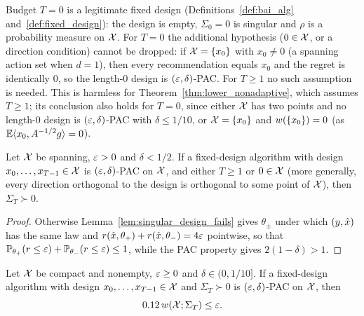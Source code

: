 \begin{remark}[The case $T = 0$]\label{rem:lower_nonadaptive_singleton}
Budget $T = 0$ is a legitimate fixed design (Definitions~\ref{def:bai_alg}
and~\ref{def:fixed_design}): the design is empty, $\Sigma_0 = 0$ is singular and $\rho$ is a
probability measure on $\mathcal{X}$. For $T = 0$ the additional hypothesis ($0 \in \mathcal{X}$, or a
direction condition) cannot be dropped: if $\mathcal{X} = \{x_0\}$ with $x_0 \ne 0$ (a spanning action set when $d = 1$),
then every recommendation equals $x_0$ and the regret is identically $0$, so the length-$0$
design is $(\varepsilon,\delta)$-PAC. For $T \ge 1$ no such assumption is needed. This is harmless for
Theorem~\ref{thm:lower_nonadaptive}, which assumes $T \ge 1$; its conclusion also holds for
$T = 0$, since either $\mathcal{X}$ has two points and no length-$0$ design is $(\varepsilon,\delta)$-PAC with
$\delta \le 1/10$, or $\mathcal{X} = \{x_0\}$ and $w(\{x_0\}) = 0$ (as $\mathbb{E}\langle x_0, A^{-1/2}g \rangle = 0$).
\end{remark}

\begin{lemma}\label{lem:lower_nonadaptive_posdef}
\leanok
{}
Let $\mathcal{X}$ be spanning, $\varepsilon > 0$ and $\delta < 1/2$. If a fixed-design algorithm with design
$x_0,\dots,x_{T-1} \in \mathcal{X}$ is $(\varepsilon,\delta)$-PAC on $\mathcal{X}$, and either $T \ge 1$ or
$0 \in \mathcal{X}$ (more generally, every direction orthogonal to the design is orthogonal to some
point of $\mathcal{X}$), then $\Sigma_T \succ 0$.
\end{lemma}

\begin{proof}
\leanok
{}
Otherwise Lemma~\ref{lem:singular_design_fails} gives $\theta_\pm$ under which $(y,\hat{x})$ has
the same law and $r(\hat{x},\theta_+) + r(\hat{x},\theta_-) = 4\varepsilon$ pointwise, so that
$\mathbb{P}_{\theta_+}(r \le \varepsilon) + \mathbb{P}_{\theta_-}(r \le \varepsilon) \le 1$, while the PAC property
gives $2(1-\delta) > 1$.
\end{proof}

\begin{lemma}\label{lem:lower_nonadaptive_bayes_step}
\leanok
{}
Let $\mathcal{X}$ be compact and nonempty, $\varepsilon \ge 0$ and $\delta \in (0, 1/10]$. If a fixed-design
algorithm with design $x_0,\dots,x_{T-1} \in \mathcal{X}$ and $\Sigma_T \succ 0$ is $(\varepsilon,\delta)$-PAC
on $\mathcal{X}$, then
\[
  0.12\,w(\mathcal{X};\Sigma_T) \le \varepsilon .
\]
\end{lemma}

